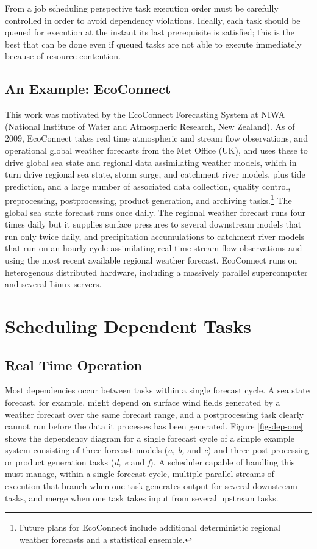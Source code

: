 \documentclass[11pt,a4paper]{article}
\begin{document}
From a job scheduling perspective task execution order must be carefully
controlled in order to avoid dependency violations. Ideally, each task
should be queued for execution at the instant its last prerequisite is
satisfied; this is the best that can be done even if queued tasks are
not able to execute immediately because of resource contention.


\subsection{An Example: EcoConnect}

This work was motivated by the EcoConnect Forecasting System at NIWA
(National Institute of Water and Atmospheric Research, New Zealand). As
of 2009, EcoConnect takes real time atmospheric and stream flow
observations, and operational global weather forecasts from the Met
Office (UK), and uses these to drive global sea state and regional data
assimilating weather models, which in turn drive regional sea state,
storm surge, and catchment river models, plus tide prediction, and a
large number of associated data collection, quality control,
preprocessing, postprocessing, product generation, and archiving
tasks.\footnote{Future plans for EcoConnect include additional
deterministic regional weather forecasts and a statistical ensemble.}
The global sea state forecast runs once daily.  The regional weather
forecast runs four times daily but it supplies surface pressures to
several downstream models that run only twice daily, and precipitation
accumulations to catchment river models that run on an hourly cycle
assimilating real time stream flow observations and using the most
recent available regional weather forecast.  EcoConnect runs on
heterogenous distributed hardware, including a massively parallel
supercomputer and several Linux servers. 

\pagebreak
\section{Scheduling Dependent Tasks }

\subsection{Real Time Operation}

Most dependencies occur between tasks within a single forecast cycle. A
sea state forecast, for example, might depend on surface wind fields
generated by a weather forecast over the same forecast range, and a
postprocessing task clearly cannot run before the data it processes
has been generated. Figure
\ref{fig-dep-one} shows the dependency diagram for a single forecast
cycle of a simple example system consisting of three forecast models
({\em a, b,} and {\em c}) and three post processing or product
generation tasks ({\em d, e} and {\em f}).  A scheduler capable of
handling this must manage, within a single forecast cycle, multiple
parallel streams of execution that branch when one task generates output
for several downstream tasks, and merge when one task takes input from
several upstream tasks. 
\end{document}

